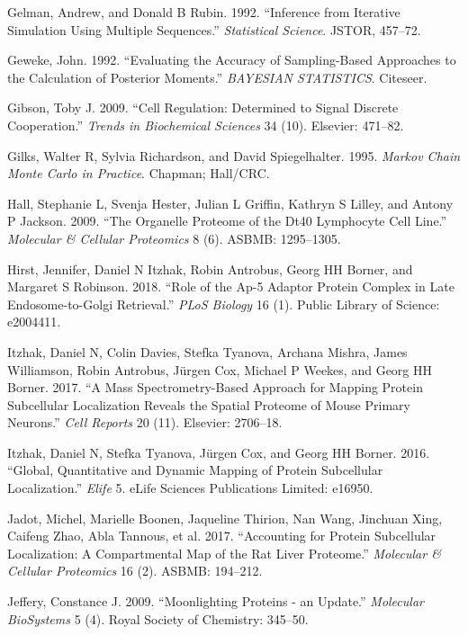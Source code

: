 \documentclass[]{article}
\begin{document}
\hypertarget{ref-Gelman:1992}{}
Gelman, Andrew, and Donald B Rubin. 1992. ``Inference from Iterative
Simulation Using Multiple Sequences.'' \emph{Statistical Science}.
JSTOR, 457--72.

\hypertarget{ref-Geweke:1992}{}
Geweke, John. 1992. ``Evaluating the Accuracy of Sampling-Based
Approaches to the Calculation of Posterior Moments.'' \emph{BAYESIAN
STATISTICS}. Citeseer.

\hypertarget{ref-Gibson:2009}{}
Gibson, Toby J. 2009. ``Cell Regulation: Determined to Signal Discrete
Cooperation.'' \emph{Trends in Biochemical Sciences} 34 (10). Elsevier:
471--82.

\hypertarget{ref-Gilks:1995}{}
Gilks, Walter R, Sylvia Richardson, and David Spiegelhalter. 1995.
\emph{Markov Chain Monte Carlo in Practice}. Chapman; Hall/CRC.

\hypertarget{ref-Hall:2009}{}
Hall, Stephanie L, Svenja Hester, Julian L Griffin, Kathryn S Lilley,
and Antony P Jackson. 2009. ``The Organelle Proteome of the Dt40
Lymphocyte Cell Line.'' \emph{Molecular \& Cellular Proteomics} 8 (6).
ASBMB: 1295--1305.

\hypertarget{ref-Hirst:2018}{}
Hirst, Jennifer, Daniel N Itzhak, Robin Antrobus, Georg HH Borner, and
Margaret S Robinson. 2018. ``Role of the Ap-5 Adaptor Protein Complex in
Late Endosome-to-Golgi Retrieval.'' \emph{PLoS Biology} 16 (1). Public
Library of Science: e2004411.

\hypertarget{ref-Itzhak:2017}{}
Itzhak, Daniel N, Colin Davies, Stefka Tyanova, Archana Mishra, James
Williamson, Robin Antrobus, Jürgen Cox, Michael P Weekes, and Georg HH
Borner. 2017. ``A Mass Spectrometry-Based Approach for Mapping Protein
Subcellular Localization Reveals the Spatial Proteome of Mouse Primary
Neurons.'' \emph{Cell Reports} 20 (11). Elsevier: 2706--18.

\hypertarget{ref-Itzhak:2016}{}
Itzhak, Daniel N, Stefka Tyanova, Jürgen Cox, and Georg HH Borner. 2016.
``Global, Quantitative and Dynamic Mapping of Protein Subcellular
Localization.'' \emph{Elife} 5. eLife Sciences Publications Limited:
e16950.

\hypertarget{ref-Jadot:2017}{}
Jadot, Michel, Marielle Boonen, Jaqueline Thirion, Nan Wang, Jinchuan
Xing, Caifeng Zhao, Abla Tannous, et al. 2017. ``Accounting for Protein
Subcellular Localization: A Compartmental Map of the Rat Liver
Proteome.'' \emph{Molecular \& Cellular Proteomics} 16 (2). ASBMB:
194--212.

\hypertarget{ref-Jeffery:2009}{}
Jeffery, Constance J. 2009. ``Moonlighting Proteins - an Update.''
\emph{Molecular BioSystems} 5 (4). Royal Society of Chemistry: 345--50.
\end{document}
